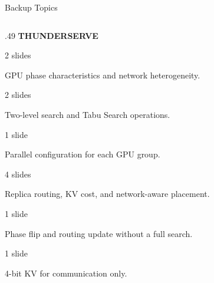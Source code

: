 \begin{frame}[t,label=backup_index]{Backup Topics}
  \par
  \vspace{.12cm}
  \begin{columns}[T,onlytextwidth]
    \begin{column}{.49\textwidth}
      {\scriptsize\bfseries\color{Accent}THUNDERSERVE}\par
      \vspace{.10cm}
      {\footnotesize{}\hfill{\scriptsize\color{Muted}2 slides}\par}
      {\scriptsize\color{Muted}GPU phase characteristics and network heterogeneity.}\par
      \vspace{.07cm}
      {\footnotesize{}\hfill{\scriptsize\color{Muted}2 slides}\par}
      {\scriptsize\color{Muted}Two-level search and Tabu Search operations.}\par
      \vspace{.07cm}
      {\footnotesize{}\hfill{\scriptsize\color{Muted}1 slide}\par}
      {\scriptsize\color{Muted}Parallel configuration for each GPU group.}\par
      \vspace{.07cm}
      {\footnotesize{}\hfill{\scriptsize\color{Muted}4 slides}\par}
      {\scriptsize\color{Muted}Replica routing, KV cost, and network-aware placement.}\par
      \vspace{.07cm}
      {\footnotesize{}\hfill{\scriptsize\color{Muted}1 slide}\par}
      {\scriptsize\color{Muted}Phase flip and routing update without a full search.}\par
      \vspace{.07cm}
      {\footnotesize{}\hfill{\scriptsize\color{Muted}1 slide}\par}
      {\scriptsize\color{Muted}4-bit KV for communication only.}\par

\end{column}
\end{columns}
\end{frame}
